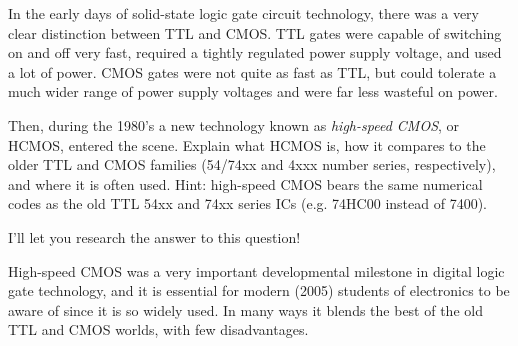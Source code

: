 

In the early days of solid-state logic gate circuit technology, there was a very clear distinction between TTL and CMOS.  TTL gates were capable of switching on and off very fast, required a tightly regulated power supply voltage, and used a lot of power.  CMOS gates were not quite as fast as TTL, but could tolerate a much wider range of power supply voltages and were far less wasteful on power.

Then, during the 1980's a new technology known as {\it high-speed CMOS}, or HCMOS, entered the scene.  Explain what HCMOS is, how it compares to the older TTL and CMOS families (54/74xx and 4xxx number series, respectively), and where it is often used.  Hint: high-speed CMOS bears the same numerical codes as the old TTL 54xx and 74xx series ICs (e.g. 74HC00 instead of 7400).







I'll let you research the answer to this question!







High-speed CMOS was a very important developmental milestone in digital logic gate technology, and it is essential for modern (2005) students of electronics to be aware of since it is so widely used.  In many ways it blends the best of the old TTL and CMOS worlds, with few disadvantages.




